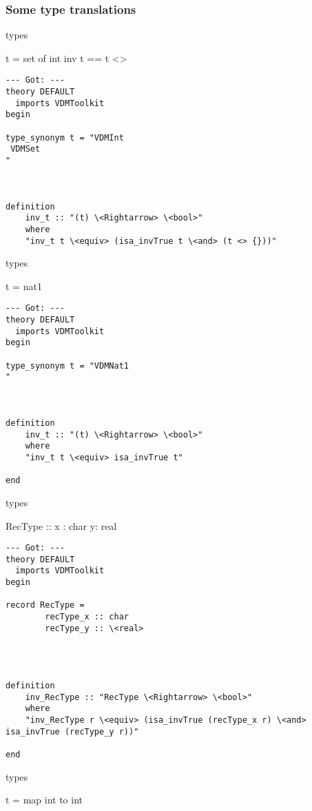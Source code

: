 \subsubsection{Some type translations}

\begin{vdmsl}
types

t = set of int
inv t == t <> {}
\end{vdmsl}

\begin{lstlisting}[language=Isabelle]
 --- Got: ---
theory DEFAULT
  imports VDMToolkit
begin

type_synonym t = "VDMInt
 VDMSet
"



definition
	inv_t :: "(t) \<Rightarrow> \<bool>"
    where
    "inv_t t \<equiv> (isa_invTrue t \<and> (t <> {}))"
\end{lstlisting}


\begin{vdmsl}
types

t = nat1
\end{vdmsl}

\begin{lstlisting}[language=Isabelle]
 --- Got: ---
theory DEFAULT
  imports VDMToolkit
begin

type_synonym t = "VDMNat1
"



definition
	inv_t :: "(t) \<Rightarrow> \<bool>"
    where
    "inv_t t \<equiv> isa_invTrue t"

end
\end{lstlisting}

\begin{vdmsl}
types

RecType :: x : char
           y: real
\end{vdmsl}

\begin{lstlisting}[language=Isabelle]
 --- Got: ---
theory DEFAULT
  imports VDMToolkit
begin

record RecType =
        recType_x :: char
        recType_y :: \<real>
    



definition
	inv_RecType :: "RecType \<Rightarrow> \<bool>"
    where
    "inv_RecType r \<equiv> (isa_invTrue (recType_x r) \<and> isa_invTrue (recType_y r))"

end
\end{lstlisting}


\begin{vdmsl}
types

t = map int to int
\end{vdmsl}

